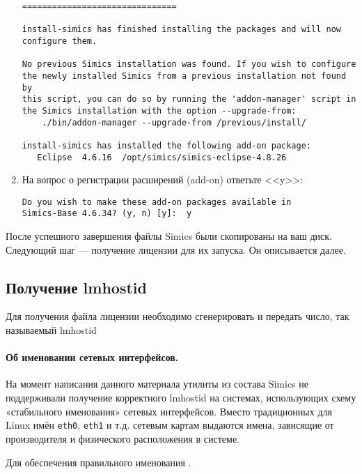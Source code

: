 \begin{enumerate}
\begin{lstlisting}
===============================

install-simics has finished installing the packages and will now
configure them.

No previous Simics installation was found. If you wish to configure
the newly installed Simics from a previous installation not found by
this script, you can do so by running the 'addon-manager' script in
the Simics installation with the option --upgrade-from:
    ./bin/addon-manager --upgrade-from /previous/install/

install-simics has installed the following add-on package:
   Eclipse  4.6.16  /opt/simics/simics-eclipse-4.8.26
\end{lstlisting}

\item На вопрос о регистрации расширений (\abbr add-on) ответьте <<y>>:
\begin{lstlisting}
Do you wish to make these add-on packages available in
Simics-Base 4.6.34? (y, n) [y]:  y
\end{lstlisting}   
\end{enumerate}

После успешного завершения файлы Simics были скопированы на ваш диск. Следующий шаг --- получение лицензии для их запуска. Он описывается далее.

\subsection{Получение lmhostid}

Для получения файла лицензии необходимо сгенерировать и передать число, так называемый lmhostid

\paragraph{Об именовании сетевых интерфейсов.} На момент написания данного материала утилиты из состава Simics не поддерживали получение корректного lmhostid на системах, использующих схему «стабильного именования» сетевых интерфейсов. Вместо традиционных для Linux имён \texttt{eth0}, \texttt{eth1} и т.д. сетевым картам выдаются имена, зависящие от производителя и физического расположения в системе.

Для обеспечения правильного именования \todo. 

